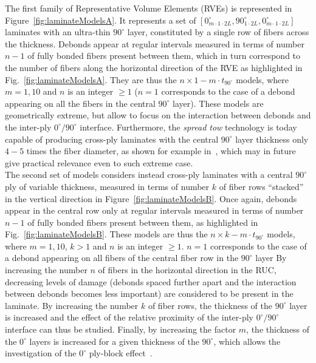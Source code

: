 \documentclass[Review,sagev,times]{sagej}
\begin{document}
The first family of Representative Volume Elements (RVEs) is represented in Figure~\ref{fig:laminateModelsA}. It represents a set of $\left[0_{m\cdot 1\cdot2L}^{\circ},90_{1\cdot2L}^{\circ},0_{m\cdot 1\cdot2L}^{\circ}\right]$ laminates with an ultra-thin $90^{\circ}$ layer, constituted by a single row of fibers across the thickness. Debonds appear at regular intervals measured in terms of number $n-1$ of fully bonded fibers present between them, which in turn correspond to the number of fibers along the horizontal direction of the RVE as highlighted in Fig.~\ref{fig:laminateModelsA}. They are thus the $n\times1-m\cdot t_{90^{\circ}}$ models, where $m=1,10$ and $n$ is an integer $\geq1$ ($n=1$ corresponds to the case of a debond appearing on all the fibers in the central $90^{\circ}$ layer). These models are geometrically extreme, but allow to focus on the interaction between debonds and the inter-ply $0^{\circ}/90^{\circ}$ interface. Furthermore, the \emph{spread tow} technology is today capable of producing cross-ply laminates with the central $90^{\circ}$ layer thickness only $4-5$ times the fiber diameter, as shown for example in~\cite{Saito2012}, which may in future give practical relevance even to such extreme case.\\
The second set of models considers instead cross-ply laminates with a central $90^{\circ}$ ply of variable thickness, measured in terms of number $k$ of fiber rows ``stacked'' in the vertical direction in Figure~\ref{fig:laminateModelsB}. Once again, debonds appear in the central row only at regular intervals measured in terms of number $n-1$ of fully bonded fibers present between them, as highlighted in Fig.~\ref{fig:laminateModelsB}. These models are thus the $n\times k-m\cdot t_{90^{\circ}}$ models, where $m=1,10$, $k>1$ and $n$ is an integer $\geq1$.  \deleted{(}$n=1$ corresponds to the case of a debond appearing on all fibers of the central fiber row in the $90^{\circ}$ layer\deleted{)} By increasing the number $n$ of fibers in the horizontal direction in the RUC, decreasing levels of damage (debonds spaced further apart and the interaction between debonds becomes less important) are considered to be present in the laminate. By increasing the number $k$ of fiber rows, the thickness of the $90^{\circ}$ layer is increased and the effect of the relative proximity of the inter-ply $0^{\circ}/90^{\circ}$ interface can thus be studied. Finally, by increasing the factor $m$, the thickness of the $0^{\circ}$ layers is increased for a given thickness of the $90^{\circ}$, which allows the investigation of the $0^{\circ}$ ply-block effect~\cite{Teixeira2016}.
\end{document}
